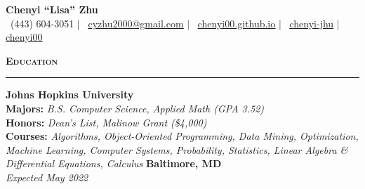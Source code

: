 \documentclass[10pt, letterpaper]{article}
\begin{document}

\begin{center}
	{\huge \textbf{Chenyi ``Lisa'' Zhu}}\\
	\vspace{2mm}
	{
	\footnotesize
	\faMobile \, (443) 604-3051 | \faEnvelopeSquare \, \href{mailto:cyzhu2000@gmail.com}{\underline{cyzhu2000@gmail.com}} | \faHome \, \href{https://chenyi00.github.io/}{\underline{chenyi00.github.io}} | \faLinkedinSquare \, \href{https://www.linkedin.com/in/chenyi-jhu/}{\underline{chenyi-jhu}} | \faGithub \, \href{https://github.com/chenyi00}{\underline{chenyi00}}}
\end{center}
\vspace{-5mm}

{\large \textbf{\textsc{Education}}}
\vspace{5pt}
\hrule
{}
\begin{paracol}{2}
	\textbf{Johns Hopkins University}\\
	\textbf{Majors:} \textit{B.S. Computer Science, Applied Math (GPA 3.52)}\\
	\textbf{Honors:} \textit{Dean's List, Malinow Grant (\$4,000)}\\
	\textbf{Courses:} \textit{Algorithms, Object-Oriented Programming, Data Mining, Optimization, Machine Learning, Computer Systems, Probability, Statistics, Linear Algebra \& Differential Equations, Calculus}
	\switchcolumn
	\raggedleft\textbf{Baltimore, MD}\\
	\raggedleft\textit{Expected May 2022}
\end{paracol}
\end{document}
